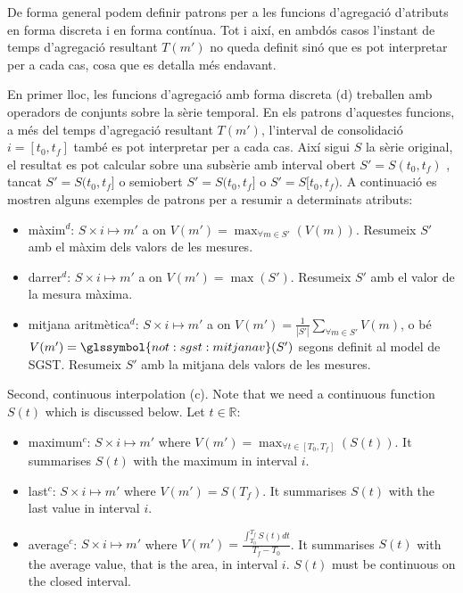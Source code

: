 De forma general podem definir patrons per a les funcions d'agregació
d'atributs en forma discreta i en forma contínua. Tot i així, en
ambdós casos l'instant de temps d'agregació resultant $T(m')$ no queda
definit sinó que es pot interpretar per a cada cas, cosa que es detalla
més endavant.


En primer lloc, les funcions d'agregació amb forma discreta (d)
treballen amb operadors de conjunts sobre la sèrie temporal. En els
patrons d'aquestes funcions, a més del temps d'agregació resultant
$T(m')$, l'interval de consolidació $i=[t_0,t_f]$ també es pot
interpretar per a cada cas. Així sigui $S$ la sèrie original, el
resultat es pot calcular sobre una subsèrie amb interval obert
$S'=S(t_0,t_f)$ , tancat $S'=S(t_0,t_f]$ o semiobert $S'=S(t_0,t_f]$ o
$S'=S[t_0,t_f)$. A continuació es mostren alguns exemples de patrons
per a resumir a determinats atributs:
\begin{itemize}
\item màxim$^d$: $S \times i \mapsto m'$ a on $V(m') = \max_{\forall m
    \in S'}(V(m))$. Resumeix $S'$ amb el màxim dels valors de les
  mesures.


\item darrer$^d$: $S \times i \mapsto m'$ a on $V(m') =
  \max(S')$. Resumeix $S'$ amb el valor de la mesura màxima.
\item mitjana aritmètica$^d$: $S \times i \mapsto m'$ a on $V(m') =
  \frac{1}{|S'|} \sum\limits_{\forall m\in S'} V(m)$, o bé $V(m') =
  \glssymbol{not:sgst:mitjanav}(S')$ segons definit al model de
  SGST. Resumeix $S'$ amb la mitjana dels valors de les mesures.
\end{itemize}


\todo{}

Second, continuous interpolation (c). Note that we need a continuous
function $S(t)$ which is discussed below. Let $t\in\mathbb{R}$:
\begin{itemize}
\item maximum$^c$: $S \times i \mapsto m'$ where $V(m') = \max_{\forall t
    \in [T_0,T_f]}(S(t))$. It summarises $S(t)$ with the maximum in
  interval $i$.
\item last$^c$: $S \times i \mapsto m'$ where $V(m') = S(T_f)$. It
  summarises $S(t)$ with the last value in interval $i$.
\item average$^c$: $S \times i \mapsto m'$ where $V(m') =
  \frac{\int_{T_0}^{T_f} S(t)dt}{T_f-T_0}$. It summarises $S(t)$ with
  the average value, that is the area, in interval $i$. $S(t)$ must be
  continuous on the closed interval.
\end{itemize}




